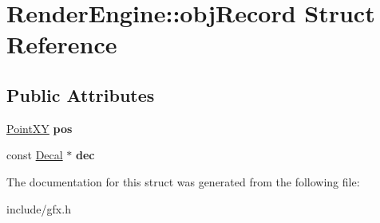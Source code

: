 \hypertarget{structRenderEngine_1_1objRecord}{}\section{Render\+Engine\+:\+:obj\+Record Struct Reference}
\label{structRenderEngine_1_1objRecord}
\subsection*{Public Attributes}
\begin{DoxyCompactItemize}
\item 
\hypertarget{structRenderEngine_1_1objRecord_a06402ecee09ee496ffa27ad16f621f05}{}\hyperlink{classPointXY}{Point\+X\+Y} {\bfseries pos}\label{structRenderEngine_1_1objRecord_a06402ecee09ee496ffa27ad16f621f05}

\item 
\hypertarget{structRenderEngine_1_1objRecord_addb8999769865f634baaf8ee15a329e2}{}const \hyperlink{classDecal}{Decal} $\ast$ {\bfseries dec}\label{structRenderEngine_1_1objRecord_addb8999769865f634baaf8ee15a329e2}

\end{DoxyCompactItemize}


The documentation for this struct was generated from the following file\+:\begin{DoxyCompactItemize}
\item 
include/gfx.\+h\end{DoxyCompactItemize}
